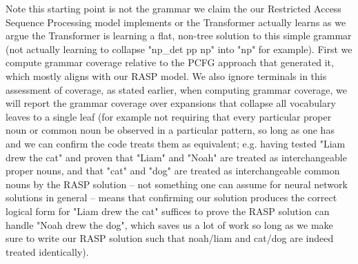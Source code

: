 \documentclass[11pt]{article}
\begin{document}
Note this starting point is not the grammar we claim the our Restricted Access Sequence Processing model implements or the Transformer actually learns as we argue the Transformer is learning a flat, non-tree solution to this simple grammar (not actually learning to collapse "np\_det pp np" into "np" for example). First we compute grammar coverage relative to the PCFG approach that generated it, which mostly aligns with our RASP model. We also ignore terminals in this assessment of coverage, as stated earlier, when computing grammar coverage, we will report the grammar coverage over expansions that collapse all vocabulary leaves to a single leaf (for example not requiring that every particular proper noun or common noun be observed in a particular pattern, so long as one has and we can confirm the code treats them as equivalent; e.g. having tested "Liam drew the cat" and proven that "Liam" and "Noah" are treated as interchangeable proper nouns, and that "cat" and "dog" are treated as interchangeable common nouns by the RASP solution -- not something one can assume for neural network solutions in general -- means that confirming our solution produces the correct logical form for "Liam drew the cat" suffices to prove the RASP solution can handle "Noah drew the dog", which saves us a lot of work so long as we make sure to write our RASP solution such that noah/liam and cat/dog are indeed treated identically).
\end{document}
